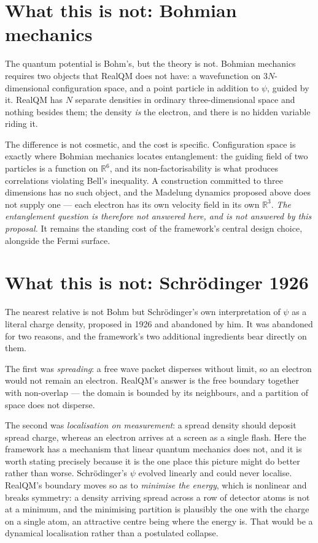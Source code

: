 \documentclass[11pt]{article}
\begin{document}
\section{What this is not: Bohmian mechanics}

The quantum potential is Bohm's, but the theory is not. Bohmian mechanics requires two objects that
RealQM does not have: a wavefunction on $3N$-dimensional configuration space, and a point particle in
addition to $\psi$, guided by it. RealQM has $N$ separate densities in ordinary three-dimensional
space and nothing besides them; the density \emph{is} the electron, and there is no hidden variable
riding it.

The difference is not cosmetic, and the cost is specific. Configuration space is exactly where
Bohmian mechanics locates entanglement: the guiding field of two particles is a function on
$\mathbb{R}^6$, and its non-factorisability is what produces correlations violating Bell's
inequality. A construction committed to three dimensions has no such object, and the Madelung
dynamics proposed above does not supply one --- each electron has its own velocity field in its own
$\mathbb{R}^3$. \emph{The entanglement question is therefore not answered here, and is not answered
by this proposal.} It remains the standing cost of the framework's central design choice, alongside
the Fermi surface.

\section{What this is not: Schr\"odinger 1926}

The nearest relative is not Bohm but Schr\"odinger's own interpretation of $\psi$ as a literal charge
density, proposed in 1926 and abandoned by him. It was abandoned for two reasons, and the framework's
two additional ingredients bear directly on them.

The first was \emph{spreading}: a free wave packet disperses without limit, so an electron would not
remain an electron. RealQM's answer is the free boundary together with non-overlap --- the domain is
bounded by its neighbours, and a partition of space does not disperse.

The second was \emph{localisation on measurement}: a spread density should deposit spread charge,
whereas an electron arrives at a screen as a single flash. Here the framework has a mechanism that
linear quantum mechanics does not, and it is worth stating precisely because it is the one place this
picture might do better rather than worse. Schr\"odinger's $\psi$ evolved linearly and could never
localise. RealQM's boundary moves so as to \emph{minimise the energy}, which is nonlinear and breaks
symmetry: a density arriving spread across a row of detector atoms is not at a minimum, and the
minimising partition is plausibly the one with the charge on a single atom, an attractive centre
being where the energy is. That would be a dynamical localisation rather than a postulated collapse.
\end{document}
